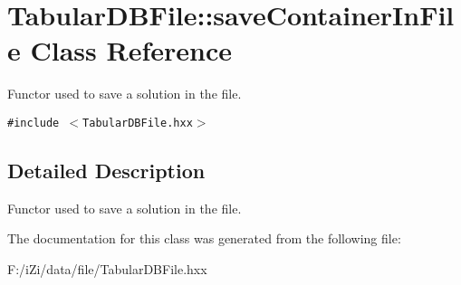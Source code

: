 \section{Tabular\-DBFile::save\-Container\-In\-File Class Reference}
\label{class_tabular_d_b_file_1_1save_container_in_file}
Functor used to save a solution in the file.  


{\tt \#include $<$Tabular\-DBFile.hxx$>$}



\subsection{Detailed Description}
Functor used to save a solution in the file. 



The documentation for this class was generated from the following file:\begin{CompactItemize}
\item 
F:/i\-Zi/data/file/Tabular\-DBFile.hxx\end{CompactItemize}

